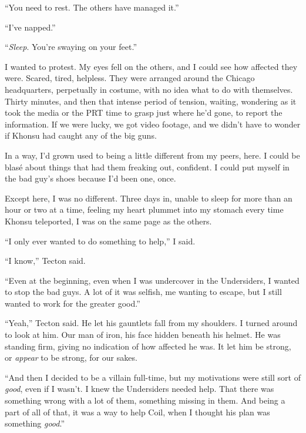 ``You need to rest.  The others have managed it.''



``I've napped.''



``\emph{Sleep}.  You're swaying on your feet.''



I wanted to protest.  My eyes fell on the others, and I could see how affected they were.  Scared, tired, helpless.  They were arranged around the Chicago headquarters, perpetually in costume, with no idea what to do with themselves.  Thirty minutes, and then that intense period of tension, waiting, wondering as it took the media or the PRT time to grasp just where he'd gone, to report the information.  If we were lucky, we got video footage, and we didn't have to wonder if Khonsu had caught any of the big guns.



In a way, I'd grown used to being a little different from my peers, here.  I could be blas\'{e} about things that had them freaking out, confident.  I could put myself in the bad guy's shoes because I'd been one, once.



Except here, I was no different.  Three days in, unable to sleep for more than an hour or two at a time, feeling my heart plummet into my stomach every time Khonsu teleported, I was on the same page as the others.



``I only ever wanted to do something to help,'' I said.



``I know,'' Tecton said.



``Even at the beginning, even when I was undercover in the Undersiders, I wanted to stop the bad guys.  A lot of it was selfish, me wanting to escape, but I still wanted to work for the greater good.''



``Yeah,'' Tecton said.  He let his gauntlets fall from my shoulders.  I turned around to look at him.  Our man of iron, his face hidden beneath his helmet.  He was standing firm, giving no indication of how affected he was.  It let him be strong, or \emph{appear} to be strong, for our sakes.



``And then I decided to be a villain full-time, but my motivations were still sort of \emph{good}, even if I wasn't.  I knew the Undersiders needed help.  That there was something wrong with a lot of them, something missing in them.  And being a part of all of that, it was a way to help Coil, when I thought his plan was something \emph{good}.''



